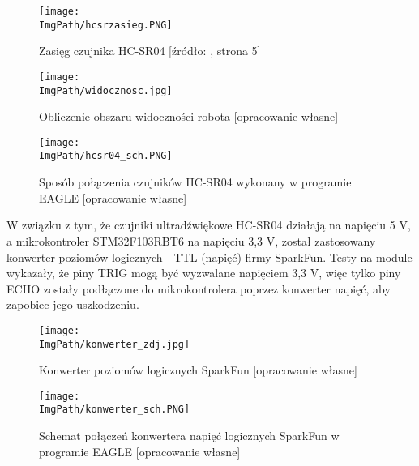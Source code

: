 \documentclass[a4paper,12pt,twoside,openany]{report}
\newcommand{\ImgPath}{.}
\begin{document}
\begin{figure}[!htbp]
	\begin{center}
\centering
\texttt{[image: \\ImgPath/hcsrzasieg.PNG]}
\end{center}
	\caption{Zasięg czujnika HC-SR04 [źródło: \cite{hcsr04}, strona 5]}
	\label{schematKomunikacji}
\end{figure}

\begin{figure}[!htbp]
	\begin{center}
\centering
\texttt{[image: \\ImgPath/widocznosc.jpg]}
\end{center}
	\caption{Obliczenie obszaru widoczności robota [opracowanie własne]}
	\label{schematKomunikacji}
\end{figure}

\begin{figure}[!htbp]
	\begin{center}
\centering
\texttt{[image: \\ImgPath/hcsr04\_sch.PNG]}
\end{center}
	\caption{Sposób połączenia czujników HC-SR04 wykonany w programie EAGLE [opracowanie własne]}
	\label{schematKomunikacji}
\end{figure}

\newpage

W związku z tym, że czujniki ultradźwiękowe HC-SR04 działają na napięciu 5 V, a mikrokontroler STM32F103RBT6 na napięciu 3,3 V, został zastosowany konwerter poziomów logicznych - TTL (napięć) firmy SparkFun. Testy na module wykazały, że piny TRIG mogą być wyzwalane napięciem 3,3 V, więc tylko piny ECHO zostały podłączone do mikrokontrolera poprzez konwerter napięć, aby zapobiec jego uszkodzeniu.

\begin{figure}[!htbp]
	\begin{center}
\centering
\texttt{[image: \\ImgPath/konwerter\_zdj.jpg]}
\end{center}
	\caption{Konwerter poziomów logicznych SparkFun [opracowanie własne]}
	\label{schematKomunikacji}
\end{figure}

\begin{figure}[!htbp]
	\begin{center}
\centering
\texttt{[image: \\ImgPath/konwerter\_sch.PNG]}
\end{center}
	\caption{Schemat połączeń konwertera napięć logicznych SparkFun w programie EAGLE [opracowanie własne]}
	\label{schematKomunikacji}
\end{figure}
\end{document}
